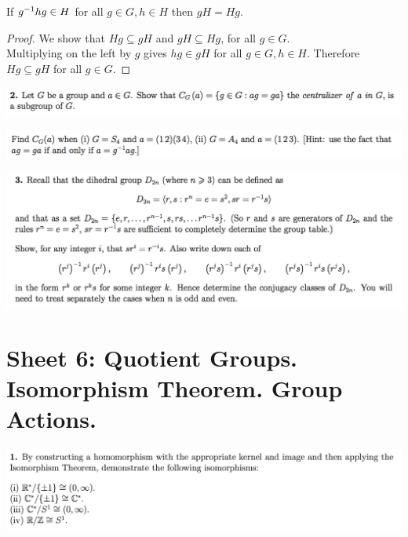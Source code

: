 \documentclass[12pt]{article}
\begin{document}
\begin{claim*}
  If $g^{-1}hg \in H$ for all $g \in G, h \in H$ then $gH = Hg$.
\end{claim*}

\begin{proof} We show that $Hg \subseteq gH$ and $gH \subseteq Hg$, for all $g \in G$.\\

Multiplying on the left by $g$ gives $hg \in gH$ for all $g \in G, h \in H$. Therefore $Hg \subseteq gH$ for all $g \in G$.
\end{proof}

\begin{mdframed}
\includegraphics[width=400pt]{img/abstract-algebra-oxford-M1-5-2-1.png}
\end{mdframed}

\begin{mdframed}
\includegraphics[width=400pt]{img/abstract-algebra-oxford-M1-5-2-2.png}
\end{mdframed}

\begin{mdframed}
\includegraphics[width=400pt]{img/abstract-algebra-oxford-M1-5-3.png}
\end{mdframed}

\newpage
\section{Sheet 6: Quotient Groups. Isomorphism Theorem. Group Actions.}

\begin{mdframed}
\includegraphics[width=400pt]{img/abstract-algebra-oxford-M1-6-1.png}
\end{mdframed}
\end{document}
